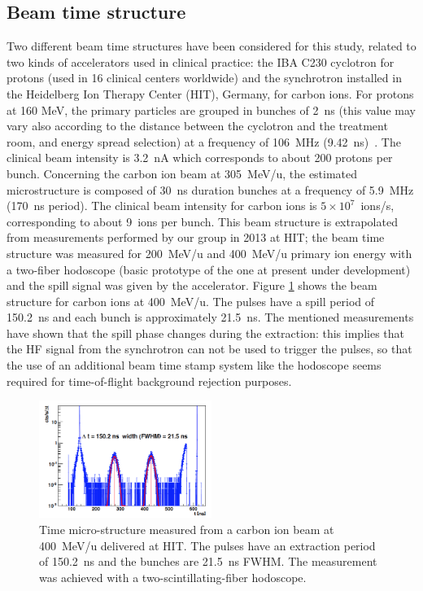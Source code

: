 \subsection{Beam time structure}
\label{subsection:modelisation_fasceau_ions_CC_hadrontherapy_Geant4}
 
Two different beam time structures have been considered for this study, related to two kinds of accelerators used in clinical practice: the IBA C230 cyclotron for protons (used in 16 clinical centers worldwide) and the synchrotron installed in the Heidelberg Ion Therapy Center (HIT), Germany, for carbon ions. For protons at 160 MeV, the primary particles are grouped in bunches of 2~ns (this value may vary also according to the distance between the cyclotron and the treatment room, and energy spread selection) at a frequency of 106~MHz (9.42~ns)~\cite{f_roellinghoff_real-time_2014}. The clinical beam intensity is 3.2~nA which corresponds to about 200 protons per bunch. Concerning the carbon ion beam at 305~MeV/u, the estimated microstructure is composed of 30~ns duration bunches at a frequency of 5.9~MHz (170~ns period). The clinical beam intensity for carbon ions is $5\times10^7$~ions/s, corresponding to about 9~ions per bunch. This beam structure is extrapolated from measurements performed by our group in 2013 at HIT; the beam time structure was measured for 200~MeV/u and 400~MeV/u primary ion energy with a two-fiber hodoscope (basic prototype of the one at present under development) and the spill signal was given by the accelerator. Figure \ref{fig:fig_structure_temps_faisceau_HIT_2013_CC_simulation_Hadronth} shows the beam structure for carbon ions at 400~MeV/u. The pulses have a spill period of 150.2~ns and each bunch is approximately 21.5~ns.
The mentioned measurements have shown that the spill phase changes during the extraction: this implies that the HF signal from the synchrotron can not be used to trigger the pulses, so that the use of an additional beam time stamp system like the hodoscope seems required for time-of-flight background rejection purposes.\newline

	\begin{figure} [!hbtp]	
	\centering
	\includegraphics[width=0.5\textwidth]{./Figure/2013_Structure_Time_Beam_400MeV.png}
	\caption{Time micro-structure measured from a carbon ion beam at 400~MeV/u delivered at HIT. The pulses have an extraction period of 150.2~ns and the bunches are 21.5~ns FWHM. The measurement was achieved with a two-scintillating-fiber hodoscope.}
	\label{fig:fig_structure_temps_faisceau_HIT_2013_CC_simulation_Hadronth}
	\end{figure}


